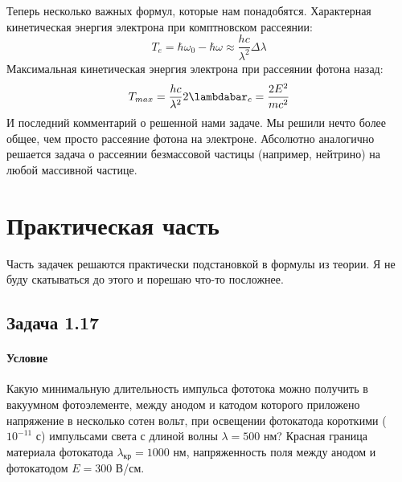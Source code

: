 \documentclass[12pt]{article}
\begin{document}
\vspace{1em} \noindent
Теперь несколько важных формул, которые нам понадобятся. Характерная кинетическая энергия электрона при комптновском рассеянии:
\begin{equation*}
    T_e = \hbar\omega_0 - \hbar\omega \approx \dfrac{hc}{\lambda^2}\Delta\lambda
\end{equation*}
Максимальная кинетическая энергия электрона при рассеянии фотона назад:
\begin{equation*}
    T_{max} =  \dfrac{hc}{\lambda^2}2\lambdabar_c = \dfrac{2E^2}{mc^2}
\end{equation*}
И последний комментарий о решенной нами задаче. Мы решили нечто более общее, чем просто рассеяние фотона на электроне. Абсолютно аналогично решается задача о рассеянии безмассовой частицы (например, нейтрино) на любой массивной частице.

\section{Практическая часть}
Часть задачек решаются практически подстановкой в формулы из теории. Я не буду скатываться до этого и порешаю что-то посложнее.

\subsection{Задача 1.17}

\label{task_117}
\paragraph{Условие} Какую минимальную длительность импульса фототока можно получить в вакуумном фотоэлементе, между анодом и катодом которого приложено напряжение в несколько сотен вольт, при освещении фотокатода короткими ($10^{-11}$ с) импульсами света с длиной волны $\lambda = 500$ нм? Красная граница материала фотокатода $\lambda_{\text{кр}} = 1000$ нм, напряженность поля между анодом и фотокатодом $E= 300$ В/см.
\end{document}
